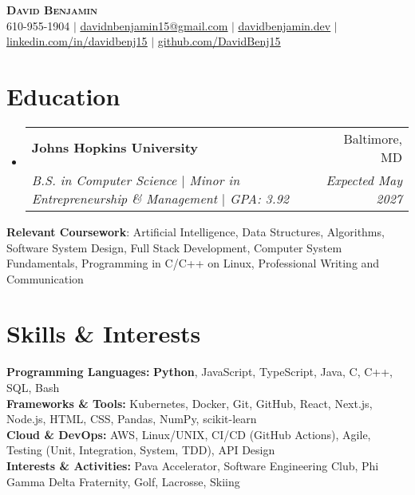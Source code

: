 \documentclass[letterpaper,10pt]{article}
\makeatletter
\newcommand{\resumeItem}[1]{
  \item\small{
    {#1 \vspace{-2pt}}
  }
}
\newcommand{\resumeSubheading}[4]{
  \vspace{-2pt}\item
    \begin{tabular*}{0.97\textwidth}[t]{l@{\extracolsep{\fill}}r}
      \textbf{#1} & #2 \\
      \textit{\small#3} & \textit{\small #4} \\
    \end{tabular*}\vspace{-7pt}
}
\newcommand{\resumeSubHeadingListStart}{\begin{itemize}[leftmargin=0.15in, label={}]}
\newcommand{\resumeSubHeadingListEnd}{\end{itemize}}
\newcommand{\resumeItemListStart}{\begin{itemize}}
\newcommand{\resumeItemListEnd}{\end{itemize}\vspace{-5pt}}
\makeatother
\begin{document}
\begin{center}
    \textbf{\Huge \scshape David Benjamin} \\ \vspace{1pt}
    \small 610-955-1904 $|$ \href{mailto:davidnbenjamin15@gmail.com}{\underline{davidnbenjamin15@gmail.com}} $|$ 
    \href{https://davidbenjamin.dev}{\underline{davidbenjamin.dev}} $|$
    \href{https://www.linkedin.com/in/davidbenj15/}{\underline{linkedin.com/in/davidbenj15}} $|$
    \href{https://github.com/DavidBenj15}{\underline{github.com/DavidBenj15}}
\end{center}

\section{Education}
  \resumeSubHeadingListStart
    \resumeSubheading
      {Johns Hopkins University}{Baltimore, MD}
      {B.S. in Computer Science $|$ Minor in Entrepreneurship \& Management $|$ GPA: 3.92}{Expected May 2027}
  \resumeSubHeadingListEnd


    \begin{itemize}[leftmargin=0.15in, label={}]
    \small{
        \item{
            \textbf{Relevant Coursework}: Artificial Intelligence, Data Structures, Algorithms, Software System Design, Full Stack Development, Computer System Fundamentals, Programming in C/C++ on Linux, Professional Writing and Communication
        }
    }
\end{itemize}

\section{Skills \& Interests}
\begin{itemize}[leftmargin=0.15in, label={}]
    \small{
        \item{
            \textbf{Programming Languages:} \textbf{Python}, JavaScript, TypeScript, Java, C, C++, SQL, Bash \\
            \textbf{Frameworks \& Tools:} Kubernetes, Docker, Git, GitHub, React, Next.js, Node.js, HTML, CSS, Pandas, NumPy, scikit-learn \\
            \textbf{Cloud \& DevOps:} AWS, Linux/UNIX, CI/CD (GitHub Actions), Agile, Testing (Unit, Integration, System, TDD), API Design \\
            \textbf{Interests \& Activities:} Pava Accelerator, Software Engineering Club, Phi Gamma Delta Fraternity, Golf, Lacrosse, Skiing
        }
    }
\end{itemize}
\end{document}
